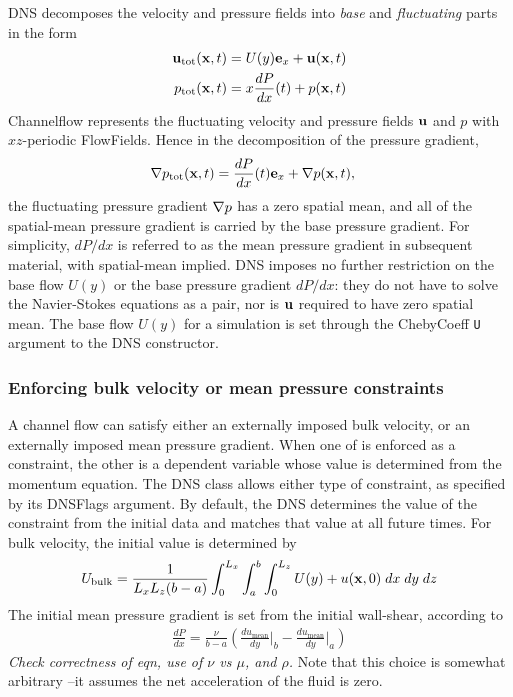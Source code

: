 \documentclass{article}[12pt]
\begin{document}
DNS decomposes the velocity and pressure fields into {\em base} and
{\em fluctuating} parts in the form
\begin{align}
{\bf u}_{\text{tot}}({\bf x},t) &= U(y) {\bf e}_x + {\bf u}({\bf x},t) \label{udecomp}\\
p_{\text{tot}}({\bf x},t)  &= x \frac{dP}{dx}(t) + p({\bf x},t)     \label{pdecomp}
\end{align}
Channelflow represents the fluctuating velocity and pressure fields
${\bf u}$ and $p$ with $xz$-periodic FlowFields. Hence in the decomposition
of the pressure gradient,
\begin{align}
{\bf \nabla} p_{\text{tot}}({\bf x},t)  &= \frac{dP}{dx}(t) {\bf e}_x + {\bf \nabla} p({\bf x},t),
\end{align}
the fluctuating pressure gradient ${\bf \nabla} p$ has a zero spatial mean,
and all of the spatial-mean pressure gradient is carried by the base
pressure gradient. For simplicity, $dP/dx$ is referred to as the
mean pressure gradient in subsequent material, with spatial-mean
implied. DNS imposes no further restriction on the
base flow $U(y)$ or the base pressure gradient $dP/dx$: they do not
have to solve the Navier-Stokes equations as a pair, nor is ${\bf u}$
required to have zero spatial mean. The base flow $U(y)$ for a
simulation is set through the ChebyCoeff {\tt U} argument to the
DNS constructor.

\subsubsection{Enforcing bulk velocity or mean pressure constraints}
\label{sec:enforcement}

A channel flow can satisfy either an externally imposed bulk velocity,
or an externally imposed mean pressure gradient. When one of
is enforced as a constraint, the other is a dependent variable whose
value is determined from the momentum equation. The DNS class allows
either type of constraint, as specified by its DNSFlags argument.
By default, the DNS determines the value of the constraint from
the initial data and matches that value at all future times. For bulk
velocity, the initial value is determined by
\begin{align}
U_{\text{bulk}} = \frac{1}{L_x L_z (b-a)} \int_0^{L_x} \int_a^b \int_0^{L_z}
U(y) + u({\bf x},0) \; dx \; dy \; dz
\end{align}
The initial mean pressure gradient is set from the initial
wall-shear, according to
\begin{align}
 \frac{dP}{dx} = \frac{\nu}{b-a}
\left( \frac{du_{\text{mean}}}{dy} \bigg\vert_b -
 \frac{du_{\text{mean}}}{dy} \bigg\vert_a \right) \label{dPdx_init}
\end{align}
{\em Check correctness of eqn, use of $\nu$ vs $\mu$, and $\rho$.}
Note that this choice is somewhat arbitrary --it assumes the net
acceleration of the fluid is zero.
\end{document}
